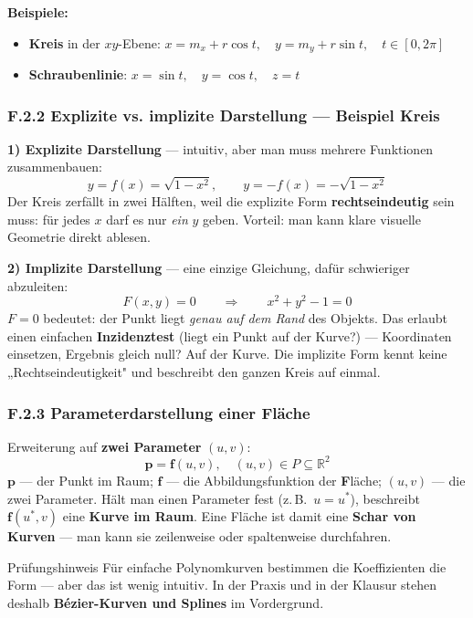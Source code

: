 \documentclass[12pt, a4paper]{article}
\begin{document}
\textbf{Beispiele:}
\begin{itemize}
  \item \textbf{Kreis} in der $xy$-Ebene: $x = m_x + r\cos t,\quad y = m_y + r\sin t,\quad t \in [0, 2\pi]$
  \item \textbf{Schraubenlinie}: $x = \sin t,\quad y = \cos t,\quad z = t$
\end{itemize}

\subsubsection*{F.2.2 Explizite vs. implizite Darstellung — Beispiel Kreis}

\textbf{1) Explizite Darstellung} — intuitiv, aber man muss mehrere Funktionen zusammenbauen:
\[
  y = f(x) = \sqrt{1 - x^2}, \qquad y = -f(x) = -\sqrt{1 - x^2}
\]
Der Kreis zerfällt in zwei Hälften, weil die explizite Form \textbf{rechtseindeutig} sein muss: für jedes $x$ darf es nur \textit{ein} $y$ geben. Vorteil: man kann klare visuelle Geometrie direkt ablesen.

\textbf{2) Implizite Darstellung} — eine einzige Gleichung, dafür schwieriger abzuleiten:
\[
  F(x, y) = 0 \qquad \Rightarrow \qquad x^2 + y^2 - 1 = 0
\]
$F = 0$ bedeutet: der Punkt liegt \textit{genau auf dem Rand} des Objekts. Das erlaubt einen einfachen \textbf{Inzidenztest} (liegt ein Punkt auf der Kurve?) — Koordinaten einsetzen, Ergebnis gleich null? Auf der Kurve. Die implizite Form kennt keine „Rechtseindeutigkeit" und beschreibt den ganzen Kreis auf einmal.

\subsubsection*{F.2.3 Parameterdarstellung einer Fläche}

Erweiterung auf \textbf{zwei Parameter} $(u, v)$:
\[
  \mathbf{p} = \mathbf{f}(u, v), \quad (u,v) \in P \subseteq \mathbb{R}^2
\]
$\mathbf{p}$ — der Punkt im Raum; $\mathbf{f}$ — die Abbildungsfunktion der \textbf{F}läche; $(u,v)$ — die zwei Parameter. Hält man einen Parameter fest (z.\,B.\ $u = u^*$), beschreibt $\mathbf{f}(u^*, v)$ eine \textbf{Kurve im Raum}. Eine Fläche ist damit eine \textbf{Schar von Kurven} — man kann sie zeilenweise oder spaltenweise durchfahren.

\begin{notebox}{Prüfungshinweis}
Für einfache Polynomkurven bestimmen die Koeffizienten die Form — aber das ist wenig intuitiv. In der Praxis und in der Klausur stehen deshalb \textbf{Bézier-Kurven und Splines} im Vordergrund.
\end{notebox}
\end{document}

